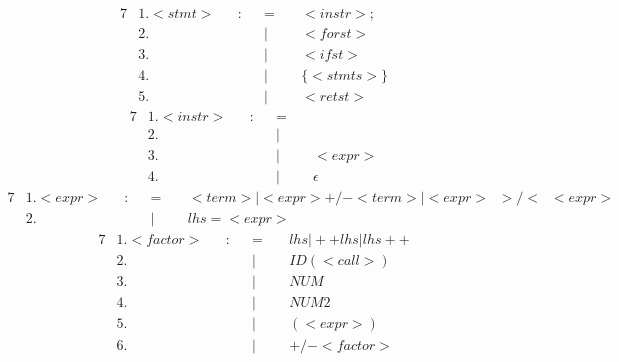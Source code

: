 \documentclass{article}
\begin{document}
\begin{alignat*}{7}
&1.<stmt>&&:&&=\;&&<instr>;\\
&2.&&&&\vert&&<forst>\\
&3.&&&&\vert&&<ifst>\\
&4.&&&&\vert&&\{<stmts>\}\\
&5.&&&&\vert&&<retst>
\end{alignat*}
\begin{alignat*}{7}
&1.<instr>&&:&&=\;&&\\
&2.&&&&\vert&&\\
&3.&&&&\vert&&<expr>\\
&4.&&&&\vert&&\epsilon
\end{alignat*}
\begin{alignat*}{7}
&1.<expr>&&:&&=\;&&<term>\vert<expr> +/- <term>\vert <expr> \;\;>/<\;\; <expr>\\
&2.&&&&\vert&&lhs = <expr>
\end{alignat*}
\begin{alignat*}{7}
&1.<factor>&&:&&=\;&&lhs\vert ++lhs\vert lhs++\\
&2.&&&&\vert&&ID(<call>)\\
&3.&&&&\vert&&NUM\\
&4.&&&&\vert&&NUM2\\
&5.&&&&\vert&&(<expr>)\\
&6.&&&&\vert&&+/- <factor>
\end{alignat*}
\end{document}
